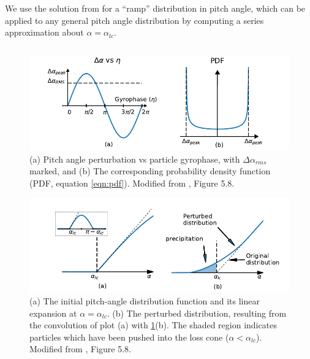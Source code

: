 We use the solution from \cite{Bortnik2005} for a ``ramp'' distribution in pitch angle, which can be applied to any general pitch angle distribution by computing a series approximation about $\alpha = \alpha_{lc}$.

\begin{equation}
\end{equation}


\begin{figure}[t]
\begin{center}
\includegraphics{figures/da_dist_and_pdf.pdf}
\caption[Pitch angle perturbation vs gyrophase, and corresponding PDF]{(a) Pitch angle perturbation vs particle gyrophase, with $\Delta \alpha_{rms}$ marked, and (b) The corresponding probability density function (PDF, equation \ref{eqn:pdf}). Modified from \cite{Bortnik2005}, Figure 5.8.}
\label{fig:da_vs_eta_and_pdf}
\end{center}
\end{figure}

\begin{figure}[h]
\begin{center}
\includegraphics{figures/da_dist_and_perturbation.pdf}
\caption[Perturbed pitch-angle distribution]{(a) The initial pitch-angle distribution function and its linear expansion at $\alpha = \alpha_{lc}$. (b) The perturbed distribution, resulting from the convolution of plot (a) with \ref{fig:da_vs_eta_and_pdf}(b). The shaded region indicates particles which have been pushed into the loss cone ($\alpha < \alpha_{lc}$). Modified from \cite{Bortnik2005}, Figure 5.8.}
\label{fig:da_dist_and_perturbation}
\end{center}
\end{figure}

